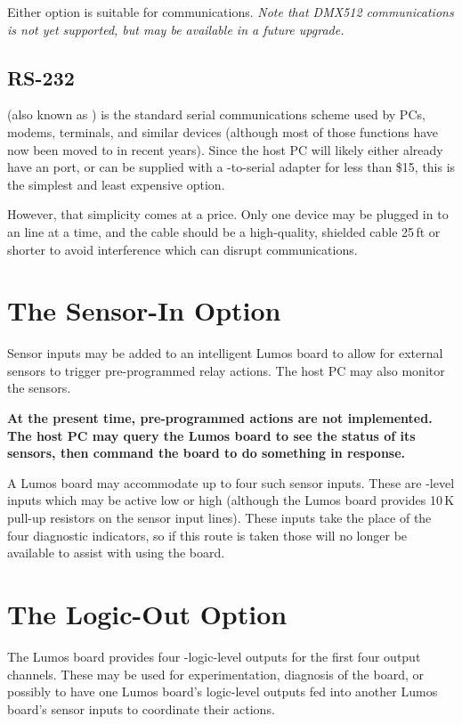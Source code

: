 \documentclass[letterpaper,twoside,onecolumn,openright,final]{memoir}
\begin{document}
Either  option is suitable for  communications.
\emph{Note that DMX512 communications is not yet supported, but may be available in a future upgrade.}

\subsection{RS-232}
 (also known as ) is the standard serial communications scheme used by
PCs, modems, terminals, and similar devices (although most of those functions have now been moved
to  in recent years).  Since the host PC will likely either already have an 
port, or can be supplied with a -to-serial adapter for less than \$15, this is the
simplest and least expensive option.

However, that simplicity comes at a price.  Only one device may be plugged in to an  line
at a time, and the cable should be a high-quality, shielded cable 25\,ft or shorter to avoid
interference which can disrupt communications.

\section{The Sensor-In Option}
Sensor inputs  may be added to an intelligent Lumos board to allow for external
sensors to trigger pre-programmed relay actions.  The host PC may also monitor the
sensors.

{\bfseries At the present time, pre-programmed actions are not implemented.  The host PC
may query the Lumos board to see the status of its sensors, then command the board to do
something in response.}

A Lumos board may accommodate up to four such sensor inputs.  These are -level inputs
which may be active low or high (although the Lumos board provides 10\,K pull-up resistors on the
sensor input lines).  These inputs take the place of the four diagnostic  indicators,
so if this route is taken those will no longer be available to assist with using the board.

\section{The Logic-Out Option}
The Lumos board provides four -logic-level outputs  
for the first four output channels.  These may be used for experimentation, diagnosis of the board,
or possibly to have one Lumos board's logic-level outputs fed into another Lumos board's sensor inputs
to coordinate their actions.
\end{document}
